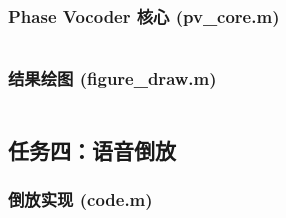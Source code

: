 \documentclass[12pt]{ctexart}
\begin{document}
\subsubsection{Phase Vocoder 核心 (pv\_core.m)}
\inputminted{matlab}{task3/pv_core.m}

\subsubsection{结果绘图 (figure\_draw.m)}
\inputminted{matlab}{task3/figure_draw.m}

\subsection{任务四：语音倒放}

\subsubsection{倒放实现 (code.m)}
\inputminted{matlab}{task4/code2.m}
\end{document}
